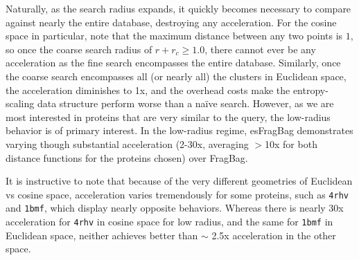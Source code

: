 \documentclass[review,preprint,12pt]{elsarticle}
\theoremstyle{definition}
\theoremstyle{remark}
\numberwithin{equation}{section}
\begin{document}
Naturally, as the search radius expands, it quickly becomes necessary to compare against nearly the entire database, destroying any acceleration.
For the cosine space in particular, note that the maximum distance between any two points is $1$, so once the coarse search radius of $r+r_c \ge 1.0$, there cannot ever be any acceleration as the fine search encompasses the entire database.
Similarly, once the coarse search encompasses all (or nearly all) the clusters in Euclidean space, the acceleration diminishes to 1x, and the overhead costs make the entropy-scaling data structure perform worse than a na\"ive search.
However, as we are most interested in proteins that are very similar to the query, the low-radius behavior is of primary interest.
In the low-radius regime, esFragBag demonstrates varying though substantial acceleration (2-30x, averaging $>$10x for both distance functions for the proteins chosen) over FragBag.

It is instructive to note that because of the very different geometries of Euclidean vs cosine space, acceleration varies tremendously for some proteins, such as \texttt{4rhv} and \texttt{1bmf}, which display nearly opposite behaviors.
Whereas there is nearly 30x acceleration for \texttt{4rhv} in cosine space for low radius, and the same for \texttt{1bmf} in Euclidean space, neither achieves better than $\sim$ 2.5x acceleration in the other space.
\end{document}

